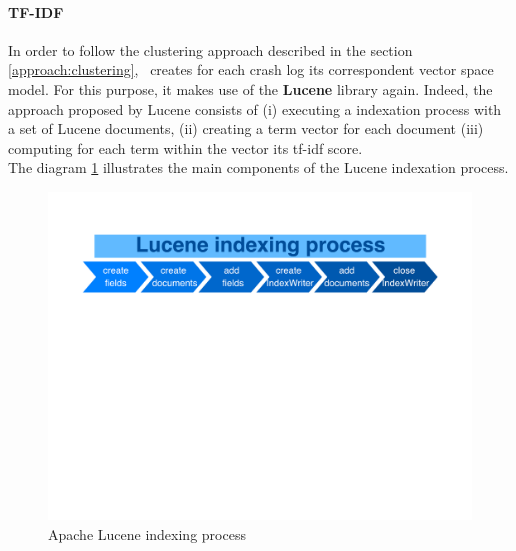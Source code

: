 \paragraph{TF-IDF}
In order to follow the clustering approach described in the section \ref{approach:clustering}, \toolname\ creates for each crash log its correspondent vector space model. 
For this purpose, it makes use of the \textbf{Lucene} library again.
Indeed, the approach proposed by Lucene consists of (i) executing a indexation process with a set of Lucene documents, (ii) creating a term vector for each document (iii) computing for each term within the vector its tf-idf score. \\ 
The  diagram \ref{fig: indexingprocess} illustrates the main components of the Lucene indexation process.
\begin{figure}[tb]
\centering 
\includegraphics[width=\columnwidth]{diagrams/indexingProcess} 
\caption{Apache Lucene indexing process}
\label{fig: indexingprocess}
\end{figure}

